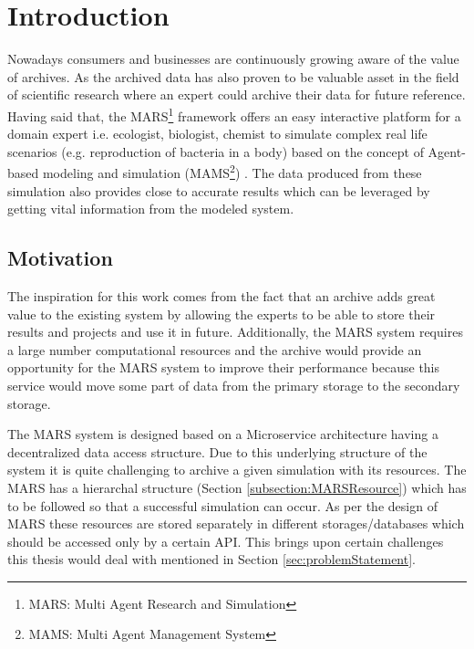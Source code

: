 \newpage
    \chapter{Introduction}
    Nowadays consumers and businesses are continuously growing aware of the value of archives. As the archived data has also proven
    to be valuable asset in the field of scientific research where an expert could archive their data for future reference. Having said that, the 
    MARS\footnote{MARS: Multi Agent Research and Simulation} framework offers an easy interactive platform for a domain expert i.e. ecologist, biologist, 
    chemist to simulate complex real life scenarios (e.g. reproduction of bacteria in a body) based on the concept of Agent-based modeling and simulation 
    (MAMS\footnote{MAMS: Multi Agent Management System}) \cite{agentModeling}. The data produced from these simulation also provides close to accurate 
    results which can be leveraged by getting vital information from the modeled system.

        \section{Motivation}
        The inspiration for this work comes from the fact that an archive adds great value to the existing system by allowing the experts to be
        able to store their results and projects and use it in future. Additionally, the MARS system requires a large number computational resources and
        the archive would provide an opportunity for the MARS system to improve their
        performance because this service would move some part of data from the primary storage to the secondary storage. 

        The MARS system is designed based on a Microservice architecture \cite{MicroserviceNewMan} having a decentralized data \cite{atomic} access structure. 
        Due to this underlying structure of the system it is quite challenging to archive a given simulation with its resources. The MARS has a hierarchal
        structure (Section \ref{subsection:MARSResource}) which has to be followed so that a successful simulation can occur. As per the design of MARS these resources
        are stored separately in different storages/databases which should be accessed only by a certain API. This brings upon certain challenges 
        this thesis would deal with mentioned in Section 
        \ref{sec:problemStatement}.  

